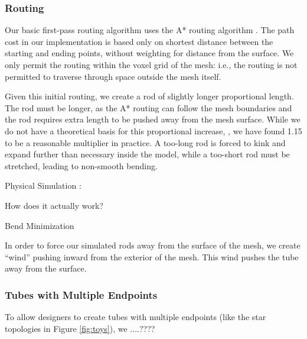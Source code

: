 \subsubsection{Routing}

Our basic first-pass routing algorithm uses the A* routing algorithm \cite{Hart-Astar}.  The path cost in our implementation is based only on shortest distance between the starting and ending points, without weighting for distance from the surface.  We only permit the routing within the voxel grid of the mesh: i.e., the routing is not permitted to traverse through space outside the mesh itself.

Given this initial routing, we create a rod of slightly longer proportional length.  The rod must be longer, as the A* routing can follow the mesh boundaries and the rod requires extra length to be pushed away from the mesh surface.  While we do not have a theoretical basis for this proportional increase, , we have found 1.15 to be a reasonable multiplier in practice.  A too-long rod is forced to kink and expand further than necessary inside the model, while a too-short rod must be stretched, leading to non-smooth bending.

Physical Simulation : 

How does it actually work? 

Bend Minimization

In order to force our simulated rods away from the surface of the mesh, we create ``wind'' pushing inward from the exterior of the mesh.  This wind pushes the tube away from the surface.

\subsubsection{Tubes with Multiple Endpoints}

To allow designers to create tubes with multiple endpoints (like the star topologies in Figure \ref{fig:toys}), we ....???? 

